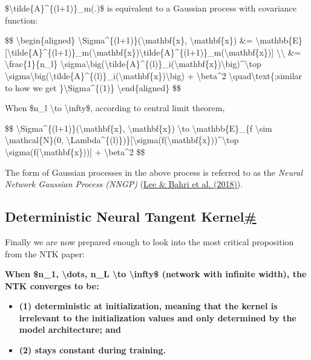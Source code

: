 \$\textbackslash tilde\{A\}\^{}\{(l+1)\}\_m(.)\$ is equivalent to a Gaussian process with covariance function:

\$\$ \textbackslash begin\{aligned\} \textbackslash Sigma\^{}\{(l+1)\}(\textbackslash mathbf\{x\}, \textbackslash mathbf\{x\}\textquotesingle) \&= \textbackslash mathbb\{E\}{[}\textbackslash tilde\{A\}\^{}\{(l+1)\}\_m(\textbackslash mathbf\{x\})\textbackslash tilde\{A\}\^{}\{(l+1)\}\_m(\textbackslash mathbf\{x\}\textquotesingle){]} \textbackslash\textbackslash{} \&= \textbackslash frac\{1\}\{n\_l\} \textbackslash sigma\textbackslash big(\textbackslash tilde\{A\}\^{}\{(l)\}\_i(\textbackslash mathbf\{x\})\textbackslash big)\^{}\textbackslash top \textbackslash sigma\textbackslash big(\textbackslash tilde\{A\}\^{}\{(l)\}\_i(\textbackslash mathbf\{x\}\textquotesingle)\textbackslash big) + \textbackslash beta\^{}2 \textbackslash quad\textbackslash text\{;similar to how we get \}\textbackslash Sigma\^{}\{(1)\} \textbackslash end\{aligned\} \$\$

When \$n\_l \textbackslash to \textbackslash infty\$, according to central limit theorem,

\$\$ \textbackslash Sigma\^{}\{(l+1)\}(\textbackslash mathbf\{x\}, \textbackslash mathbf\{x\}\textquotesingle) \textbackslash to \textbackslash mathbb\{E\}\_\{f \textbackslash sim \textbackslash mathcal\{N\}(0, \textbackslash Lambda\^{}\{(l)\})\}{[}\textbackslash sigma(f(\textbackslash mathbf\{x\}))\^{}\textbackslash top \textbackslash sigma(f(\textbackslash mathbf\{x\}\textquotesingle)){]} + \textbackslash beta\^{}2 \$\$

The form of Gaussian processes in the above process is referred to as the \emph{Neural Network Gaussian Process (NNGP)} (\href{https://arxiv.org/abs/1711.00165}{Lee \& Bahri et al. (2018)}).

\subsection{\texorpdfstring{Deterministic Neural Tangent Kernel\hyperref[deterministic-neural-tangent-kernel]{\#}}{Deterministic Neural Tangent Kernel\#}}\label{deterministic-neural-tangent-kernel}

Finally we are now prepared enough to look into the most critical proposition from the NTK paper:

\textbf{When \$n\_1, \textbackslash dots, n\_L \textbackslash to \textbackslash infty\$ (network with infinite width), the NTK converges to be:}

\begin{itemize}
\tightlist
\item
  \textbf{(1) deterministic at initialization, meaning that the kernel is irrelevant to the initialization values and only determined by the model architecture; and}
\item
  \textbf{(2) stays constant during training.}
\end{itemize}

